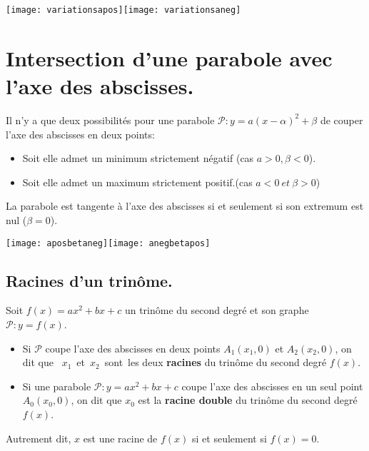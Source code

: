 \documentclass[a4paper,11pt]{article}
\theoremstyle{break}
\begin{document}
      \texttt{[image: variationsapos]}\hspace{1cm}\texttt{[image: variationsaneg]}
    

     
     \section{Intersection d'une parabole avec l'axe des abscisses.}
    
    \begin{Prop}
    Il n'y a que deux possibilités pour une parabole $\mathcal{P}:y=a(x-\alpha)^2+\beta$ 
    de couper l'axe des abscisses en deux points:
   \begin{itemize}
    \item Soit elle admet un minimum strictement négatif (cas $a>0, \beta <0$).
    \item Soit elle admet un maximum strictement positif.(cas $a<0\ et\ \beta >0$)
   \end{itemize}
   
   La parabole est tangente à l'axe des abscisses si et seulement si son extremum est 
   nul ($\beta=0$).

  \end{Prop}
  
  \texttt{[image: aposbetaneg]}\hspace{0.3cm}\texttt{[image: anegbetapos]}
  
  \subsection{Racines d'un trinôme.}
  
  \begin{Def}
    Soit $f(x)=ax^2+bx+c$ un trinôme du second degré et son graphe $\mathcal{P}:y=f(x)$.
    \begin{itemize}
     \item 
    Si $\mathcal{P}$ coupe l'axe des abscisses en deux points 
    $A_1(x_1,0)$ et $A_2(x_2,0)$,
    on dit que \mbox{ $x_1$ et $x_2$ sont les} deux \textbf{racines} 
    du trinôme du second degré $f(x)$.
    
    \item
    Si une parabole $\mathcal{P}:y=ax^2+bx+c$ coupe l'axe des abscisses en un seul 
    point $A_0(x_0,0)$, on dit que $x_0$ est la \textbf{racine double} du trinôme du second 
    degré $f(x)$.
    
    
    \end{itemize}

    
    Autrement dit, $x$ est une racine de $f(x)$ si et seulement si $f(x)=0$.
  \end{Def}
  
\end{document}
